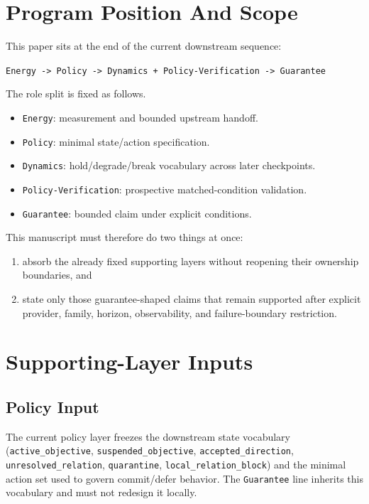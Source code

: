 \documentclass[11pt]{article}
\begin{document}
\section{Program Position And Scope}

This paper sits at the end of the current downstream sequence:

\begin{center}
\texttt{Energy -> Policy -> Dynamics + Policy-Verification -> Guarantee}
\end{center}

\noindent The role split is fixed as follows.

\begin{itemize}
\item \texttt{Energy}: measurement and bounded upstream handoff.
\item \texttt{Policy}: minimal state/action specification.
\item \texttt{Dynamics}: hold/degrade/break vocabulary across later checkpoints.
\item \texttt{Policy-Verification}: prospective matched-condition validation.
\item \texttt{Guarantee}: bounded claim under explicit conditions.
\end{itemize}

This manuscript must therefore do two things at once:
\begin{enumerate}
\item absorb the already fixed supporting layers without reopening their ownership
boundaries, and
\item state only those guarantee-shaped claims that remain supported after explicit
provider, family, horizon, observability, and failure-boundary restriction.
\end{enumerate}

\section{Supporting-Layer Inputs}

\subsection{Policy Input}

The current policy layer freezes the downstream state vocabulary
(\texttt{active\_objective}, \texttt{suspended\_objective},
\texttt{accepted\_direction}, \texttt{unresolved\_relation},
\texttt{quarantine}, \texttt{local\_relation\_block}) and the minimal action set
used to govern commit/defer behavior. The \texttt{Guarantee} line inherits this
vocabulary and must not redesign it locally.
\end{document}
